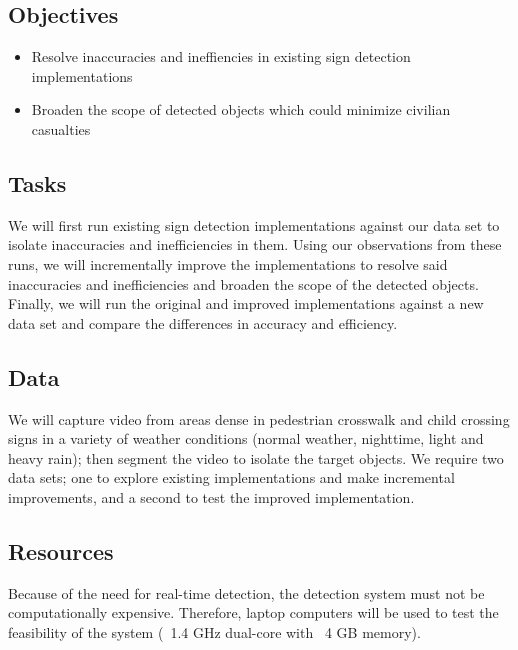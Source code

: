 \documentclass{article}
\begin{document}
\subsection{Objectives}

\begin{itemize}
 \item Resolve inaccuracies and ineffiencies in existing sign detection implementations
 \item Broaden the scope of detected objects which could minimize civilian casualties
\end{itemize}

\subsection{Tasks}

We will first run existing sign detection implementations against our data set
to isolate inaccuracies and inefficiencies in them.  Using our observations
from these runs, we will incrementally improve the implementations to resolve
said inaccuracies and inefficiencies and broaden the scope of the detected
objects. Finally, we will run the original and improved implementations
against a new data set and compare the differences in accuracy and efficiency. 

\subsection{Data}

We will capture video from areas dense in pedestrian crosswalk and child
crossing signs in a variety of weather conditions (normal weather, nighttime,
light and heavy rain); then segment the video to isolate the target objects.
We require two data sets; one to explore existing implementations and make
incremental improvements, and a second to test the improved implementation.

\subsection{Resources}

Because of the need for real-time detection, the detection system must not be
computationally expensive. Therefore, laptop computers will be used to test the
feasibility of the system (~1.4 GHz dual-core with ~4 GB memory).
\end{document}
